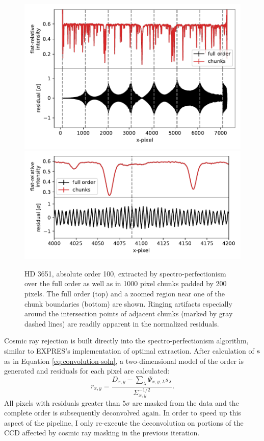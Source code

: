 \begin{figure}
    \centering
    \includegraphics[width=\textwidth]{figures-5/spec-perf-ringing-1.pdf}
    \includegraphics[width=\textwidth]{figures-5/spec-perf-ringing-2.pdf}
    \caption[Ringing artifacts from chunked spectro-perfectionism]{HD 3651, absolute order 100, extracted by spectro-perfectionism over the full order as well as in 1000 pixel chunks padded by 200 pixels. The full order (top) and a zoomed region near one of the chunk boundaries (bottom) are shown. Ringing artifacts especially around the intersection points of adjacent chunks (marked by gray dashed lines) are readily apparent in the normalized residuals.}
    \label{fig:spec-perf-ringing}
\end{figure}

Cosmic ray rejection is built directly into the spectro-perfectionism algorithm, similar to EXPRES's implementation of optimal extraction. After calculation of $\vb{s}$ as in Equation \ref{eq:convolution-soln}, a two-dimensional model of the order is generated and residuals for each pixel are calculated:
\begin{equation}
    r_{x,y} = \frac{D_{x,y} - \sum_\lambda{\Psi_{x,y,\lambda}s_\lambda}} {\Sigma_{x,y}^{-1/2}}.
    \label{eq:spec-perf-resid}
\end{equation}
All pixels with residuals greater than $5\sigma$ are masked from the data and the complete order is subsequently deconvolved again. In order to speed up this aspect of the pipeline, I only re-execute the deconvolution on portions of the CCD affected by cosmic ray masking in the previous iteration.

